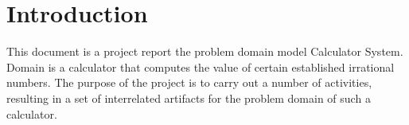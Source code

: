 \section{Introduction}
This document is a project report the problem domain model Calculator System. Domain is a calculator that computes the value of certain established irrational numbers. The purpose of the project is to carry out a number of activities, resulting in a set of interrelated artifacts for the problem domain of such a calculator.